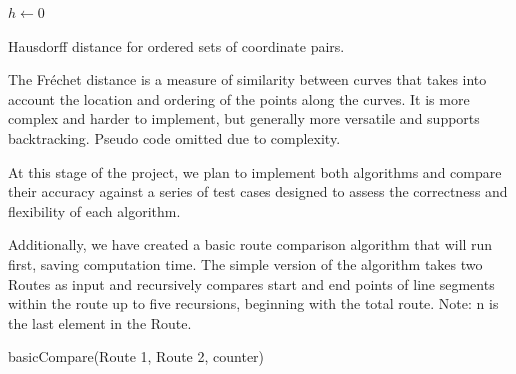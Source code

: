 ﻿\documentclass{article}
\begin{document}
\begin{algorithm}[h]
\SetAlgoLined
$h \gets 0$\\
\caption{Hausdorff distance for ordered sets of coordinate pairs.}
\end{algorithm}

The Fréchet distance is a measure of similarity between curves that takes into account the location and ordering of the points along the curves.\cite{g_frechet} It is more complex and harder to implement, but generally more versatile and supports backtracking. Pseudo code omitted due to complexity.

At this stage of the project, we plan to implement both algorithms and compare their accuracy against a series of test cases designed to assess the correctness and flexibility of each algorithm.

Additionally, we have created a basic route comparison algorithm that will run first, saving computation time. The simple version of the algorithm takes two Routes as input and recursively compares start and end points of line segments within the route up to five recursions, beginning with the total route.
\newline Note: n is the last element in the Route.\newline

\begin{algorithm}[H]
\SetAlgoLined
{}
\caption{basicCompare(Route 1, Route 2, counter)}
\end{algorithm}

\pagebreak
\end{document}
